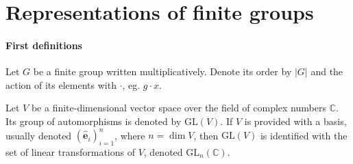 \documentclass[12pt, a4paper, twoside]{article}
\theoremstyle{definition}
\theoremstyle{remark}
\numberwithin{equation}{section}
\newcommand{\CC}{\mathbb{C}}
\newcommand{\1}{\mathbf{1}}
\newcommand{\0}{\mathbf{0}}
\newcommand{\GL}{\text{GL}}
\newcommand{\bas}{\mathbf{\hat{e}}}
\begin{document}





\clearpage{\thispagestyle{empty}\cleardoublepage}
{\hypersetup{linkcolor=black}
\tableofcontents
}

%


\clearpage{\thispagestyle{empty}}
\section{Representations of finite groups}

\paragraph{First definitions}

	Let $G$ be a finite group written multiplicatively. Denote its order by $|G|$ and the action of its elements with $\cdot$, eg. $g \cdot x$.
	
	Let $V$ be a finite-dimensional vector space over the field of complex numbers $\CC$. Its group of automorphisms is denoted by $\GL(V)$. If $V$ is provided with a basis, usually denoted $(\bas_i)_{i=1}^n$, where $n = \dim V$, then $\GL(V)$ is identified with the set of linear transformations of $V$, denoted $\GL_n(\CC)$\cite[18.1]{DummitFoote}.
	
\end{document}
